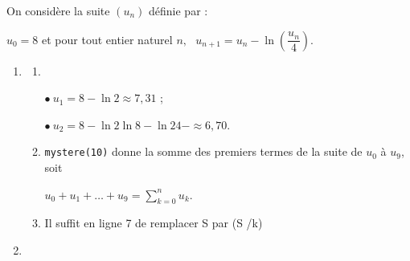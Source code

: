 
\medskip

On considère la suite $\left(u_n\right)$ définie par : 

\begin{center} $u_0 = 8$ \:  et pour tout entier naturel \:\:$n,\:\:~u_{n+1} = u_n -\ln\left(\dfrac{u_n}{4}\right)$.\end{center}

\begin{enumerate}
\item 
	\begin{enumerate}
		\item ~%
		
$\bullet~u_1 = 8 - \ln 2 \approx 7,31$ ;
		
$\bullet~u_2 = 8 - \ln 2  \ln {8 - \ln 2}{4}- \approx 6,70$.

		\item %

	
\texttt{mystere(10)} donne la somme des premiers termes de la suite de $u_0$ à $u_9$, soit 

$u_0 + u_1 + \ldots + u_9 = \displaystyle\sum_{k=0}^n u_k$.
		\item %
Il suffit en ligne 7 de remplacer S par (S /k)
	\end{enumerate}
\item %


\end{enumerate}
